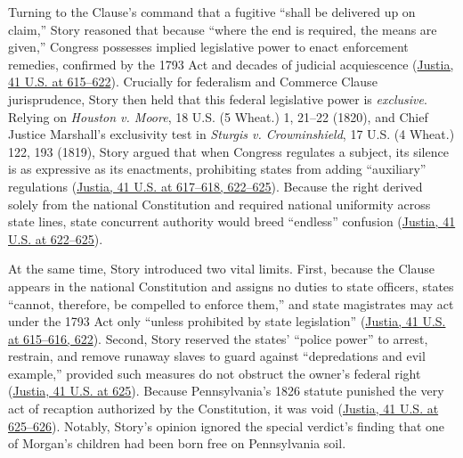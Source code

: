 \documentclass[12pt]{article}
\begin{document}
Turning to the Clause's command that a fugitive ``shall be delivered up on claim,'' Story reasoned that because ``where the end is required, the means are given,'' Congress possesses implied legislative power to enact enforcement remedies, confirmed by the 1793 Act and decades of judicial acquiescence (\href{https://supreme.justia.com/cases/federal/us/41/539/}{Justia, 41 U.S. at 615--622}). Crucially for federalism and Commerce Clause jurisprudence, Story then held that this federal legislative power is \textit{exclusive}. Relying on \textit{Houston v. Moore}, 18 U.S. (5 Wheat.) 1, 21--22 (1820), and Chief Justice Marshall's exclusivity test in \textit{Sturgis v. Crowninshield}, 17 U.S. (4 Wheat.) 122, 193 (1819), Story argued that when Congress regulates a subject, its silence is as expressive as its enactments, prohibiting states from adding ``auxiliary'' regulations (\href{https://supreme.justia.com/cases/federal/us/41/539/}{Justia, 41 U.S. at 617--618, 622--625}). Because the right derived solely from the national Constitution and required national uniformity across state lines, state concurrent authority would breed ``endless'' confusion (\href{https://supreme.justia.com/cases/federal/us/41/539/}{Justia, 41 U.S. at 622--625}).

At the same time, Story introduced two vital limits. First, because the Clause appears in the national Constitution and assigns no duties to state officers, states ``cannot, therefore, be compelled to enforce them,'' and state magistrates may act under the 1793 Act only ``unless prohibited by state legislation'' (\href{https://supreme.justia.com/cases/federal/us/41/539/}{Justia, 41 U.S. at 615--616, 622}). Second, Story reserved the states' ``police power'' to arrest, restrain, and remove runaway slaves to guard against ``depredations and evil example,'' provided such measures do not obstruct the owner's federal right (\href{https://supreme.justia.com/cases/federal/us/41/539/}{Justia, 41 U.S. at 625}). Because Pennsylvania's 1826 statute punished the very act of recaption authorized by the Constitution, it was void (\href{https://supreme.justia.com/cases/federal/us/41/539/}{Justia, 41 U.S. at 625--626}). Notably, Story's opinion ignored the special verdict's finding that one of Morgan's children had been born free on Pennsylvania soil.
\end{document}
